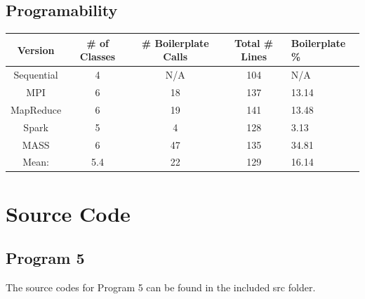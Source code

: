 \documentclass{article}
\begin{document}
		\subsection{Programability} \label{PROG}
        		\begin{minipage}{\linewidth}
                    \centering
        			\begin{tabular}{c|ccc}\label{T6}
        				Version 	& \# of Classes & \# Boilerplate Calls & Total \# Lines & Boilerplate \%\\
        				\hline
        				Sequential	& 4		& N/A	& 104 	& N/A 	\\
        				MPI			& 6		& 18	& 137 	& 13.14 \\
        				MapReduce	& 6		& 19	& 141	& 13.48	\\
        				Spark		& 5		& 4		& 128	&  3.13	\\
        				MASS		& 6		& 47	& 135	& 34.81	\\
        			\noalign{\smallskip}\hline\noalign{\smallskip}
        				Mean: 		& 5.4	& 22	& 129	& 16.14	\\
        			\end{tabular}
        		\smallskip\smallskip\smallskip\smallskip
                \end{minipage}


\pagebreak
	
	\section{Source Code} \label{SRC}
		\subsection{Program 5} \label{P5_SRC}
		The source codes for Program 5 can be found in the included src folder.\\
	
	
\end{document}

